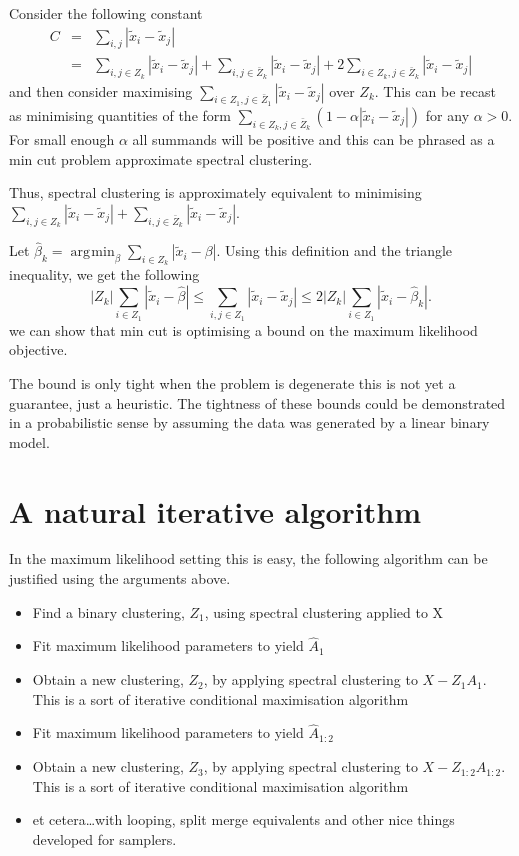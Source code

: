\documentclass{article}
\numberwithin{equation}{section}
\numberwithin{thm}{section}
\def\IBP{Z}
\def\Weights{A}
\def\Data{X}
\DeclareMathOperator*{\argmin}{\arg\!\min}
\begin{document}
Consider the following constant
\begin{eqnarray}
C & = & \sum_{i,j}|\tilde x_i - \tilde x_j| \\
  & = & \sum_{i,j \in \IBP_k}|\tilde x_i - \tilde x_j| + \sum_{i,j \in \bar\IBP_k}|\tilde x_i - \tilde x_j| + 2\sum_{i \in \IBP_k, j \in \bar\IBP_k}|\tilde x_i - \tilde x_j|
\end{eqnarray}
and then consider maximising $\sum_{i \in \IBP_1, j \in \bar\IBP_1}|\tilde x_i - \tilde x_j|$ over $\IBP_k$.
This can be recast as minimising quantities of the form $\sum_{i \in \IBP_k, j \in \bar\IBP_k}(1 - \alpha|\tilde x_i - \tilde x_j|)$ for any $\alpha > 0$.
For small enough $\alpha$ all summands will be positive and this can be phrased as a min cut problem \ie approximate spectral clustering.

Thus, spectral clustering is approximately equivalent to minimising $\sum_{i,j \in \IBP_k}|\tilde x_i - \tilde x_j| + \sum_{i,j \in \bar\IBP_k}|\tilde x_i - \tilde x_j|$.

Let $\hat\beta_k = \argmin_\beta \sum_{i \in \IBP_k}|\tilde x_i - \beta|$. Using this definition and the triangle inequality, we get the following
\begin{equation}
|\IBP_k|\sum_{i \in \IBP_1}|\tilde x_i - \hat\beta| \leq \sum_{i,j \in \IBP_1}|\tilde x_i - \tilde x_j| \leq 2|\IBP_k|\sum_{i \in \IBP_1}|\tilde x_i - \hat\beta_k|.
\end{equation}
\ie we can show that min cut is optimising a bound on the maximum likelihood objective.

The bound is only tight when the problem is degenerate \ie this is not yet a guarantee, just a heuristic.
The tightness of these bounds could be demonstrated in a probabilistic sense by assuming the data was generated by a linear binary model.

\section{A natural iterative algorithm}

In the maximum likelihood setting this is easy, the following algorithm can be justified using the arguments above.
\begin{itemize}
\item Find a binary clustering, $\IBP_1$, using spectral clustering applied to \Data
\item Fit maximum likelihood parameters to yield $\hat\Weights_1$
\item Obtain a new clustering, $\IBP_2$, by applying spectral clustering to $\Data - \IBP_1\Weights_1$. This is a sort of iterative conditional maximisation algorithm
\item Fit maximum likelihood parameters to yield $\hat\Weights_{1:2}$
\item Obtain a new clustering, $\IBP_{3}$, by applying spectral clustering to $\Data - \IBP_{1:2}\Weights_{1:2}$. This is a sort of iterative conditional maximisation algorithm
\item et cetera\ldots with looping, split merge equivalents and other nice things developed for samplers.
\end{itemize}
\end{document}

